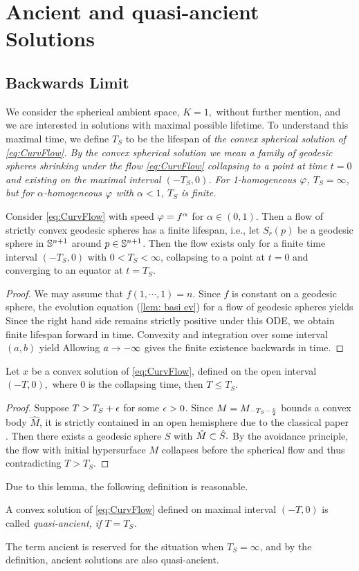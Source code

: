 \documentclass{amsart}
\begin{document}
\section{Ancient and quasi-ancient Solutions}
\subsection{Backwards Limit}
We consider the spherical ambient space, $K=1,$ without further mention, and we are interested in solutions with maximal possible lifetime. To understand this maximal time, we define $T_S$ to be the lifespan of \it{the} convex spherical solution of \eqref{eq:CurvFlow}. By the convex spherical solution we mean a family of geodesic spheres shrinking under the flow \eqref{eq:CurvFlow} collapsing to a point at time $t=0$ and existing on the maximal interval \((-T_S, 0)\). For 1-homogeneous $\p$, \(T_S = \infty\), but for $\alpha$-homogeneous $\p$ with $\alpha<1$, \(T_S\) is finite.
\begin{lemma}
 Consider \eqref{eq:CurvFlow} with speed \(\p = f^{\alpha}\) for \(\alpha \in (0,1)\). Then a flow of strictly convex geodesic spheres has a finite lifespan, i.e., let $S_r(p)$ be a geodesic sphere in $\S^{n+1}$ around $p\in \S^{n+1}$. Then the flow exists only for a finite time interval \((-T_S,0)\) with \(0 < T_S < \infty\), collapsing to a point at \(t=0\) and converging to an equator at \(t=T_S\).
\end{lemma}
\begin{proof}
We may assume that $f(1,\cdots,1)=n.$
Since $f$ is constant on a geodesic sphere, the evolution equation (\ref{lem: basi ev}) for a flow of geodesic spheres yields
Since the right hand side remains strictly positive under this ODE, we obtain finite lifespan forward in time.
Convexity and integration over some interval $(a,b)$ yield
Allowing $a\ra-\8$ gives the finite existence backwards in time.
\end{proof}
\begin{lemma}
Let $x$ be a convex solution of \eqref{eq:CurvFlow}, defined on the open interval $(-T,0),$ where $0$ is the collapsing time, then $T\leq T_S.$
\end{lemma}

\begin{proof}
Suppose $T>T_S+\e$ for some $\e>0$. Since $M=M_{-T_S-\fr{\e}{2}}$ bounds a convex body $\hat{M}$, it is strictly contained in an open hemisphere due to the classical paper \cite{CarmoWarner:/1970}. Then there exists a geodesic sphere $S$ with $\hat{M}\sub\hat{S}.$ By the avoidance principle, the flow with initial hypersurface $M$ collapses before the spherical flow and thus contradicting $T>T_S$.
\end{proof}
Due to this lemma, the following definition is reasonable.
\begin{definition}
A convex solution of \eqref{eq:CurvFlow} defined on maximal interval $(-T,0)$ is called \it{quasi-ancient}, if $T=T_S$.
\end{definition}
The term ancient is reserved for the situation when \(T_S=\infty\), and by the definition, ancient solutions are also quasi-ancient.
\end{document}

